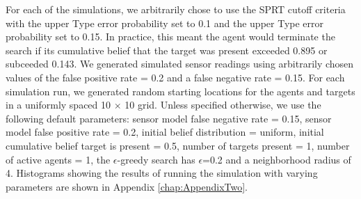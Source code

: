 \par For each of the simulations, we arbitrarily chose to use the SPRT cutoff criteria with the upper Type  error probability set to 0.1 and the upper Type  error probability set to 0.15. In practice, this meant the agent would terminate the search if its cumulative belief that the target was present exceeded 0.895 or subceeded 0.143. We generated simulated sensor readings using arbitrarily chosen values of the false positive rate = 0.2 and a false negative rate = 0.15. For each simulation run, we generated random starting locations for the agents and targets in a uniformly spaced 10 $\times$ 10 grid. Unless specified otherwise, we use the following default parameters: sensor model false negative rate = 0.15, sensor model false positive rate = 0.2, initial belief distribution = uniform, initial cumulative belief target is present = 0.5, number of targets present = 1, number of active agents = 1, the $\epsilon$-greedy search has $\epsilon$=0.2 and a neighborhood radius of 4. Histograms showing the results of running the simulation with varying parameters are shown in Appendix \ref{chap:AppendixTwo}.





